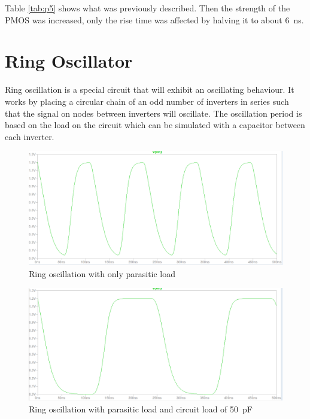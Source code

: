 \documentclass[CMPE]{../KGCOEReport}
\begin{document}
	Table \ref{tab:p5} shows what was previously described. Then the strength
	of the PMOS was increased, only the rise time was affected by halving it to
	about \SI{6}{\nano\s}.

	\section*{Ring Oscillator}

	Ring oscillation is a special circuit that will exhibit an oscillating
	behaviour. It works by placing a circular chain of an odd number of
	inverters in series such that the signal on nodes between inverters will
	oscillate. The oscillation period is based on the load on the circuit which
	can be simulated with a capacitor between each inverter.

	\begin{figure}[h!]
     	\centering
       \includegraphics[width=5.5in]{img/p6_no_load}
       \caption{Ring oscillation with only parasitic load}
       \label{fig:os_n}
	 \end{figure}

	\begin{figure}[h!]
     	\centering
       \includegraphics[width=5.5in]{img/p6_load}
       \caption{Ring oscillation with parasitic load and circuit load of \SI{50}{\pico\farad}}
       \label{fig:os_l}
	\end{figure}
\end{document}
